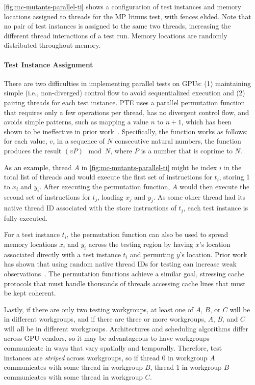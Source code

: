 \myfiglong\ref{fig:mc-mutants-parallel-ti} shows a configuration of test instances and memory locations assigned to threads for the MP litmus test, with fences elided. Note that no pair of test instances is assigned to the same two threads, increasing the different thread interactions of a test run. Memory locations are randomly distributed throughout memory.

\paragraph{Test Instance Assignment} There are two difficulties in implementing parallel tests on GPUs: (1) maintaining simple (i.e., non-diverged) control flow to avoid sequentialized execution and (2) pairing threads for each test instance.  PTE uses a parallel permutation function that requires only a few operations per thread, has no divergent control flow, and avoids simple patterns, such as mapping a value $n$ to $n + 1$, which has been shown to be ineffective in prior work~\cite{kirkham2020foundations}. Specifically, the function works as follows: for each value, $v$, in a sequence of $N$ consecutive natural numbers, the function produces the result $(vP)\mod{N}$, where $P$ is a number that is coprime to $N$.

As an example, thread $A$ in \myfig\ref{fig:mc-mutants-parallel-ti} might be index $i$ in the total list of threads and would execute the first set of instructions for $t_i$, storing 1 to $x_i$ and $y_i$. After executing the permutation function, $A$ would then execute the second set of instructions for $t_j$, loading $x_j$ and $y_j$. As some other thread had its native thread ID associated with the store instructions of $t_j$, each test instance is fully executed.

For a test instance $t_i$, the permutation function can also be used to spread memory locations $x_i$ and $y_i$ across the testing region by having $x$'s location associated directly with a test instance $t_i$ and permuting $y$'s location. Prior work has shown that using random native thread IDs for testing can increase weak observations~\cite{alglave2015gpu,sorensen2016exposing}. The permutation functions achieve a similar goal, stressing cache protocols that must handle thousands of threads accessing cache lines that must be kept coherent.

Lastly, if there are only two testing workgroups, at least one of $A$, $B$, or $C$ will be in different workgroups, and if there are three or more workgroups, $A$, $B$, and $C$ will all be in different workgroups. Architectures and scheduling algorithms differ across GPU vendors, so it may be advantageous to have workgroups communicate in ways that vary spatially and temporally. Therefore, test instances are \textit{striped} across workgroups, so if thread 0 in workgroup $A$ communicates with some thread in workgroup $B$, thread 1 in workgroup $B$ communicates with some thread in workgroup $C$.

